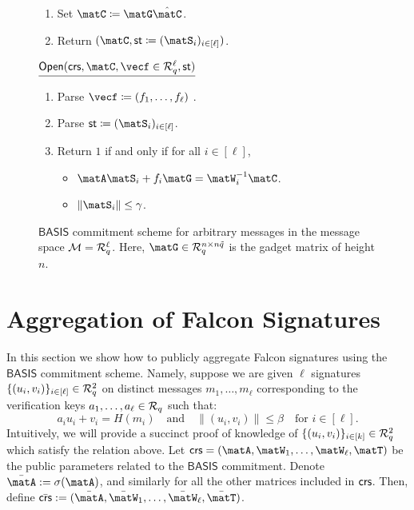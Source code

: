 \documentclass[11pt,letterpaper]{article}
\newcounter{theo}[section]
\theoremstyle{definition} %
\begin{document}
\begin{figure}
\begin{theo}
\begin{enumerate}[noitemsep]
      \item Set $\matC \coloneqq \matG \hat{\matC}$.
      \item Return $(\matC, \polystate \coloneqq (\matS_i)_{i \in [\ell]})$.
    \end{enumerate}
    \vspace{5mm}
    $\underline{\polyopen(\crs, \matC, \vecf \in \Rq^{\ell}, \polystate)}$
    \begin{enumerate}[noitemsep]
    \item Parse $\vecf \coloneqq  (f_1,\ldots,f_\ell)$ .
      \item Parse $\polystate \coloneqq (\matS_i)_{i \in [\ell]}$.
      \item Return $1$ if and only if for all $i \in [\ell]$, 
      \begin{itemize}
          \item $\matA \matS_i + f_i \matG = \matW_i^{-1} \matC$.
          \item $\|\matS_i\| \leq \gamma$.
      \end{itemize}
    \end{enumerate}
    \end{theo}
    \caption{$\mathsf{BASIS}$ commitment scheme for arbitrary messages in the message space $\mathcal{M} = \mathcal{R}_q^{\ell}$. Here, $\matG \in \Rq^{n \times n\q}$ is the gadget matrix of height $n$.}
    \label{fig:basis-commitment}
\end{figure}

\section{Aggregation of Falcon Signatures}
In this section we show how to publicly aggregate Falcon signatures using the $\mathsf{BASIS}$ commitment scheme. Namely, suppose we are given $\ell$ signatures $\{(u_i,v_i)\}_{i \in [\ell]} \in \mathcal{R}_q^2$ on distinct messages $m_1,\ldots,m_\ell$ corresponding to the verification keys $a_1,\ldots,a_\ell \in \mathcal{R}_q$ such that:
\[ a_iu_i + v_i = H(m_i) \quad \text{and} \quad \|(u_i,v_i)\| \leq \beta \quad \text{for } i \in [\ell].\]
Intuitively, we will provide a succinct proof of knowledge of $\{(u_i,v_i)\}_{i \in [k]} \in \mathcal{R}_q^2$ which satisfy the relation above.  Let $\crs = (\matA,\matW_1,\ldots,\matW_\ell,\matT)$ be the public parameters related to the $\mathsf{BASIS}$ commitment. Denote $\bar{\matA} := \sigma(\matA)$, and similarly for all the other matrices included in $\mathsf{crs}$. Then, define $\bar{\crs} := (\bar{\matA},\bar{\matW}_1,\ldots,\bar{\matW}_\ell,\bar{\matT})$.
\end{document}
